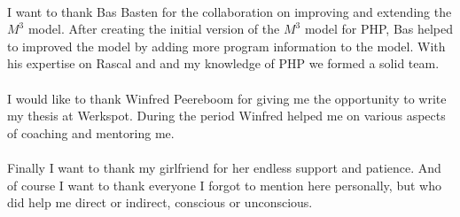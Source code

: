 \documentclass[../main.tex]{subfiles}
\begin{document}
    \paragraph{}
    I want to thank Bas Basten for the collaboration on improving and extending the $M^3$ model.
    After creating the initial version of the $M^3$ model for PHP, Bas helped to improved the model by adding more program information to the model.
    With his expertise on Rascal and and my knowledge of PHP we formed a solid team.
    
    \paragraph{}
    I would like to thank Winfred Peereboom for giving me the opportunity to write my thesis at Werkspot.
    During the period Winfred helped me on various aspects of coaching and mentoring me.
	
    \paragraph{}
    Finally I want to thank my girlfriend for her endless support and patience.
    And of course I want to thank everyone I forgot to mention here personally, but who did help me direct or indirect, conscious or unconscious.
\end{document}
